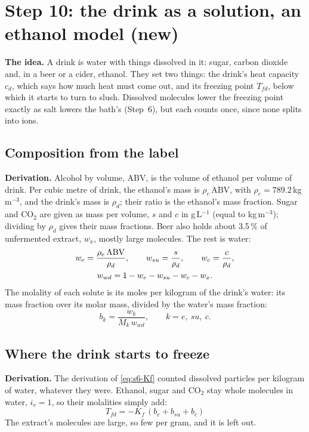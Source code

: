 \documentclass[11pt,a4paper]{article}
\newcommand{\Tfd}{T_{fd}}
\newcommand{\para}[1]{\par\smallskip\noindent\textbf{#1}\enspace}
\begin{document}
\section{Step 10: the drink as a solution, an ethanol model (new)}\label{sec:s10}

\para{The idea.} A drink is water with things dissolved in it: sugar, carbon dioxide and, in a beer or a
cider, ethanol. They set two things: the drink's heat capacity $c_d$, which says how much heat must come
out, and its freezing point $\Tfd$, below which it starts to turn to slush. Dissolved molecules lower the
freezing point exactly as salt lowers the bath's (Step~6), but each counts once, since none splits into
ions.

\subsection{Composition from the label}
\para{Derivation.} Alcohol by volume, ABV, is the volume of ethanol per volume of drink. Per cubic metre of
drink, the ethanol's mass is $\rho_e\,\mathrm{ABV}$, with $\rho_e = 789.2$\,kg\,m$^{-3}$, and the drink's mass is
$\rho_d$; their ratio is the ethanol's mass fraction. Sugar and CO$_2$ are given as mass per volume, $s$ and
$c$ in g\,L$^{-1}$ (equal to kg\,m$^{-3}$); dividing by $\rho_d$ gives their mass fractions. Beer also holds
about 3.5\,\% of unfermented extract, $w_x$, mostly large molecules. The rest is water:
\begin{gather}
w_e = \frac{\rho_e\,\mathrm{ABV}}{\rho_d},\qquad w_{su} = \frac{s}{\rho_d},\qquad w_c = \frac{c}{\rho_d}, \label{eq:s10-fractions}\\
w_{wd} = 1 - w_e - w_{su} - w_c - w_x . \notag
\end{gather}
The molality of each solute is its moles per kilogram of the drink's water: its mass fraction over its molar
mass, divided by the water's mass fraction:
\begin{equation}
b_k = \frac{w_k}{M_k\,w_{wd}},\qquad k = e,\ su,\ c . \label{eq:s10-molality}
\end{equation}

\subsection{Where the drink starts to freeze}
\para{Derivation.} The derivation of \eqref{eq:s6-Kf} counted dissolved particles per kilogram of water,
whatever they were. Ethanol, sugar and CO$_2$ stay whole molecules in water, $i_v = 1$, so their molalities
simply add:
\begin{equation}
\boxed{\,\Tfd = -K_f\,(b_e + b_{su} + b_c)\,} \label{eq:s10-Tfd}
\end{equation}
The extract's molecules are large, so few per gram, and it is left out.
\end{document}
